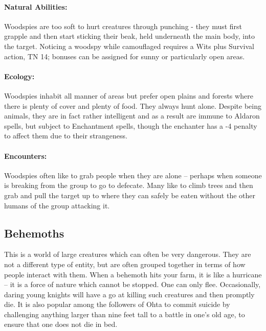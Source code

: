 \begin{multicols}{2}
\begin{boxtext}
\end{boxtext}

\paragraph{Natural Abilities:} Woodspies are too soft to hurt creatures through punching - they must first grapple and then start sticking their beak, held underneath the main body, into the target.  Noticing a woodspy while camouflaged requires a Wits plus Survival action, TN 14; bonuses can be assigned for sunny or particularly open areas.

\woodspy

\paragraph{Ecology:} Woodspies inhabit all manner of areas but prefer open plains and forests where there is plenty of cover and plenty of food.  They always hunt alone.  Despite being animals, they are in fact rather intelligent and as a result are immune to Aldaron spells, but subject to Enchantment spells, though the enchanter has a -4 penalty to affect them due to their strangeness.

\paragraph{Encounters:} Woodspies often like to grab people when they are alone -- perhaps when someone is breaking from the group to go to defecate.  Many like to climb trees and then grab and pull the target up to where they can safely be eaten without the other humans of the group attacking it.

\subsection{Behemoths}

This is a world of large creatures which can often be very dangerous.  They are not a different type of entity, but are often grouped together in terms of how people interact with them.  When a behemoth hits your farm, it is like a hurricane -- it is a force of nature which cannot be stopped.  One can only flee.  Occasionally, daring young knights will have a go at killing such creatures and then promptly die.  It is also popular among the followers of Ohta to commit suicide by challenging anything larger than nine feet tall to a battle in one's old age, to ensure that one does not die in bed.


\end{multicols}
